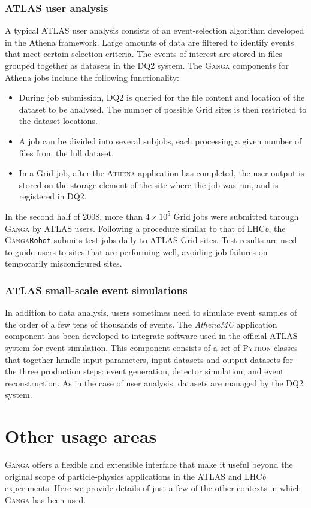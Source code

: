 \documentclass{elsart}
\def\lhcb {LHC{\em b\/}\xspace}
\def\atlas {ATLAS\xspace}
\def\ganga {\textsc{Ganga}\xspace}
\def\python {\textsc{Python}\xspace}
\def\athena {\textsc{Athena}\xspace}
\def\grid {Grid\xspace}
\newcommand{\code}[1]{\texttt{#1}}
\begin{document}
\subsubsection{\atlas user analysis}
A typical \atlas user analysis consists of an event-selection algorithm
developed in the Athena framework. Large amounts of data are filtered to
identify events that meet certain selection criteria. The events of interest are
stored in files grouped together as datasets in the DQ2 system.  The \ganga
components for Athena jobs include the following functionality:
\begin{itemize}
\item During job submission, DQ2 is queried for the file content and location
of the dataset to be analysed.  The number of possible \grid sites is then
restricted to the dataset locations.
\item A job can be divided into several subjobs, each processing a given
number of files from the full dataset.
\item In a \grid job, after the \athena
application has completed, the user output 
is stored on the storage element of the site where the job was run, and is
registered in DQ2.
\end{itemize}

In the second half of 2008, more than $4 \times 10^5$ \grid jobs were submitted
through \ganga by \atlas users.  Following a procedure similar to that of
\lhcb, the \ganga \code{Robot} submits test jobs daily to \atlas \grid
sites.  Test results are used to guide users to sites that are performing
well, avoiding job failures on temporarily misconfigured sites.

\subsubsection{\atlas small-scale event simulations}
In addition to data analysis, users sometimes need to simulate event samples
of the order of a few tens of thousands of events. The \emph{AthenaMC}
application component has
been developed to integrate software used in the official \atlas system
for event simulation.  This component consists of a set of \python classes
that together handle input
parameters, input datasets and output datasets for the three
production steps: event generation, detector simulation, and
event  reconstruction. As in the case of user analysis, 
datasets are managed by
the DQ2 system.

\section{Other usage areas}
\label{sec:other}
\ganga offers a flexible and extensible interface that make it useful
beyond the original scope of particle-physics
applications in the \atlas and \lhcb experiments. Here we provide
details of just a few of the other contexts in which \ganga has been
used.
\end{document}
